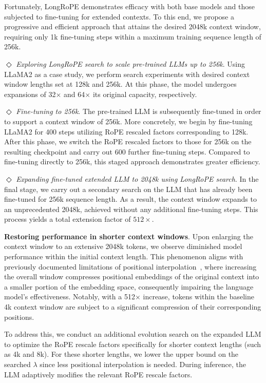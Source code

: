 Fortunately, LongRoPE demonstrates efficacy with both base models and those subjected to fine-tuning for extended contexts. To this end, we propose a progressive and efficient approach that attains the desired 2048k context window, requiring only 1k fine-tuning steps within a maximum training sequence length of 256k.

$\Diamond$ \textit{Exploring LongRoPE search to scale pre-trained LLMs up to 256k}. Using LLaMA2 as a case study, we perform search experiments with desired context window lengths set at 128k and 256k. At this phase, the model undergoes expansions of 32$\times$ and 64$\times$ its original capacity, respectively.

$\Diamond$ \textit{Fine-tuning to 256k}. The pre-trained LLM is subsequently fine-tuned in order to support a context window of 256k. More concretely, we begin by fine-tuning LLaMA2 for 400 steps utilizing RoPE rescaled factors corresponding to 128k. After this phase, we switch the RoPE rescaled factors to those for 256k on the resulting checkpoint and carry out 600 further fine-tuning steps. Compared to fine-tuning directly to 256k, this staged approach demonstrates greater efficiency.

$\Diamond$ \textit{Expanding fine-tuned extended LLM to 2048k using LongRoPE search}. In the final stage, we carry out a secondary search on the LLM that has already been fine-tuned for 256k sequence length. As a result, the context window expands to an unprecedented 2048k, achieved without any additional fine-tuning steps. This process yields a total extension factor of $512\times$.

\textbf{Restoring performance in shorter context windows}. Upon enlarging the context window to an extensive 2048k tokens, we observe diminished model performance within the initial context length. This phenomenon aligns with previously documented limitations of positional interpolation~\cite{pi}, where increasing the overall window compresses positional embeddings of the original context into a smaller portion of the embedding space, consequently impairing the language model's effectiveness. Notably, with a 512$\times$ increase, tokens within the baseline 4k context window are subject to a significant compression of their corresponding positions.

To address this, we conduct an additional evolution search on the expanded LLM to optimize the RoPE rescale factors specifically for shorter context lengths (such as 4k and 8k). For these shorter lengths, we lower the upper bound on the searched $\lambda$ since less positional interpolation is needed. During inference, the LLM adaptively modifies the relevant RoPE rescale factors.

